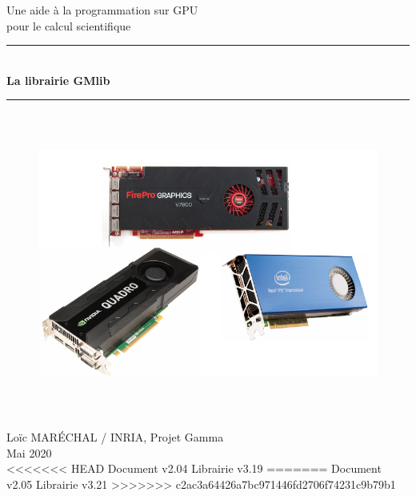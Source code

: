\documentclass[a4paper,12pt]{article}
\newcommand{\HRule}{\rule{\linewidth}{1mm}}
\begin{document}
%
%

\begin{titlepage}

\begin{center}
\huge Une aide à la programmation sur GPU\\ pour le calcul scientifique
\HRule \\
\medskip
{\Huge \bfseries La librairie GMlib} \\
\HRule
\end{center}


\begin{figure}[htbp]
\begin{center}
\includegraphics[height=10cm]{gpu.pdf}
\end{center}
\end{figure}


\begin{flushright}
\Large Lo\"ic MAR\'ECHAL / INRIA, Projet Gamma\\
\Large Mai 2020 \\
<<<<<<< HEAD
\normalsize Document v2.04
\normalsize Librairie v3.19
=======
\normalsize Document v2.05
\normalsize Librairie v3.21
>>>>>>> c2ac3a64426a7bc971446fd2706f74231c9b79b1
\end{flushright}

\end{titlepage}

\clearpage
\end{document}
